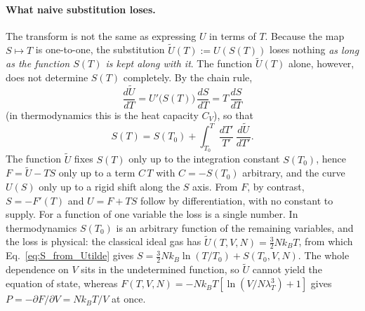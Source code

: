 \documentclass[10pt,a4paper]{article}
\theoremstyle{remark}
\begin{document}
\paragraph{What naive substitution loses.} The transform is not the same as
expressing $U$ in terms of $T$. Because the map $S\mapsto T$ is one-to-one,
the substitution $\tilde U(T):= U(S(T))$ loses nothing \emph{as long as the
function $S(T)$ is kept along with it}. The function $\tilde U(T)$ alone,
however, does not determine $S(T)$ completely. By the chain rule,
\[
  \frac{d\tilde U}{dT}=U'\big(S(T)\big)\,\frac{dS}{dT}=T\,\frac{dS}{dT}
\]
(in thermodynamics this is the heat capacity $C_V$), so that
\begin{equation}\label{eq:S_from_Utilde}
  S(T)=S(T_0)+\int_{T_0}^{T}\frac{dT'}{T'}\,\frac{d\tilde U}{dT'} .
\end{equation}
The function $\tilde U$ fixes $S(T)$ only up to the integration constant
$S(T_0)$, hence $F=\tilde U-TS$ only up to a term $C\,T$ with $C=-S(T_0)$
arbitrary, and the curve $U(S)$ only up to a rigid shift along the $S$ axis.
From $F$, by contrast, $S=-F'(T)$ and $U=F+TS$ follow by differentiation, with
no constant to supply. For a function of one variable the loss is a single
number. In thermodynamics $S(T_0)$ is an arbitrary function of the remaining
variables, and the loss is physical: the classical ideal gas has
$\tilde U(T,V,N)=\tfrac32Nk_BT$, from which Eq.~\eqref{eq:S_from_Utilde} gives
$S=\tfrac32Nk_B\ln(T/T_0)+S(T_0,V,N)$. The whole dependence on $V$ sits in the
undetermined function, so $\tilde U$ cannot yield the equation of state, whereas
$F(T,V,N)=-Nk_BT[\ln(V/N\lambda_T^{3})+1]$ gives $P=-\partial F/\partial V=Nk_BT/V$
at once.
\end{document}
